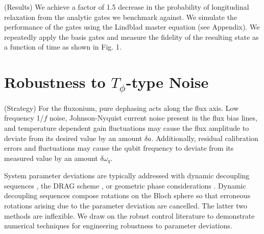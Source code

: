 \documentclass[
  amsfonts,
  amsmath,
  tbtags,
  amssymb,
  aps,
  nobibnotes,
  twocolumn,
]{revtex4-2}
\begin{document}
(Results) We achieve a factor of 1.5 decrease in the probability
of longitudinal relaxation from the analytic gates we benchmark
against. We simulate the performance of the gates using the
Lindblad master equation (see Appendix). We repeatedly apply the basis gates
and measure the fidelity of the resulting state as a function
of time as shown in Fig. 1.



\section{Robustness to $T_{\phi}$-type Noise}
(Strategy) For the fluxonium, pure dephasing acts
along the flux axis. Low frequency 1/$f$ noise,
Johnson-Nyquist current noise present in the flux bias
lines, and temperature dependent gain fluctuations
may cause the flux amplitude to deviate from its
desired value by an amount $\delta a$. Additionally,
residual calibration errors and fluctuations may cause
the qubit frequency to deviate from its measured value
by an amount $\delta \omega_{q}$.

System parameter
deviations are typically addressed with dynamic decoupling
sequences \cite{merrill2014progress},
the DRAG scheme \cite{krantz2019quantum}, or
geometric phase considerations
\cite{xu2020nonadiabatic} \cite{han2020experimental}.
Dynamic decoupling sequences compose rotations on the
Bloch sphere so that erroneous rotations arising due
to the parameter deviation are cancelled.
The latter two methods are inflexible. We draw on the
robust control literature to demonstrate
numerical techniques for engineering robustness
to parameter deviations.
\end{document}
